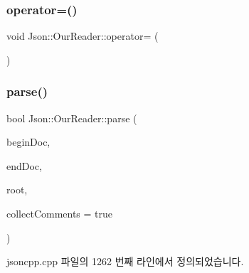 \subsubsection{\texorpdfstring{operator=()}{operator=()}}
{\footnotesize\ttfamily void Json\+::\+Our\+Reader\+::operator= (\begin{DoxyParamCaption}\item[{\hyperlink{class_json_1_1_our_reader}{Our\+Reader} const \&}]{ }\end{DoxyParamCaption})\hspace{0.3cm}{\ttfamily [private]}}

\mbox{\label{class_json_1_1_our_reader_aba4f8749aab7f02ec17f107e392caf80}} 
\subsubsection{\texorpdfstring{parse()}{parse()}}
{\footnotesize\ttfamily bool Json\+::\+Our\+Reader\+::parse (\begin{DoxyParamCaption}\item[{const char $\ast$}]{begin\+Doc,  }\item[{const char $\ast$}]{end\+Doc,  }\item[{\hyperlink{class_json_1_1_value}{Value} \&}]{root,  }\item[{bool}]{collect\+Comments = {\ttfamily true} }\end{DoxyParamCaption})}



jsoncpp.\+cpp 파일의 1262 번째 라인에서 정의되었습니다.


